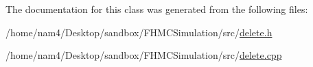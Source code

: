 The documentation for this class was generated from the following files\-:\begin{DoxyCompactItemize}
\item 
/home/nam4/\-Desktop/sandbox/\-F\-H\-M\-C\-Simulation/src/\hyperlink{delete_8h}{delete.\-h}\item 
/home/nam4/\-Desktop/sandbox/\-F\-H\-M\-C\-Simulation/src/\hyperlink{delete_8cpp}{delete.\-cpp}\end{DoxyCompactItemize}
